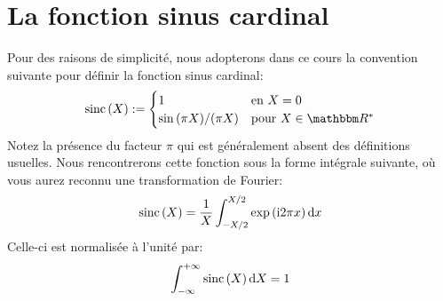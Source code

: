 \section{La fonction sinus cardinal}

Pour des raisons de simplicité,
nous adopterons dans ce cours la convention suivante pour définir la fonction sinus cardinal:
\begin{equation*}
\sinc{X} \eqdef \begin{cases}
1 & \text{en $X = 0$} \\
\sin{( \pi X )} / ( \pi X ) & \text{pour $X \in \IR^*$}
\end{cases}
\end{equation*}
Notez la présence du facteur $\pi$ qui est généralement absent des définitions usuelles.
Nous rencontrerons cette fonction sous la forme intégrale suivante,
où vous aurez reconnu une transformation de Fourier:
\begin{equation*}
\mathrm{sinc} \left( {X} \right) = \frac 1 X \int_{-X/2}^{X/2} \mathrm{exp} \left( {\mathrm{i} 2 \pi x} \right) \mathrm dx
\end{equation*}
Celle-ci est normalisée à l'unité par:
\begin{equation*}
\int_{-\infty}^{+\infty} \mathrm{sinc} \left( {X} \right) \mathrm dX = 1
\end{equation*}
